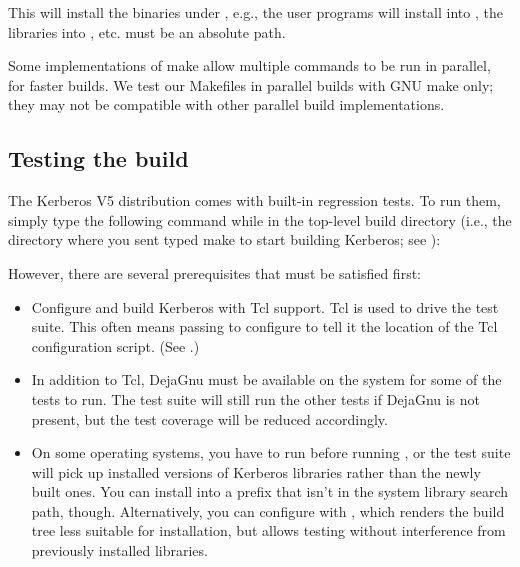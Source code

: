 \documentclass[letterpaper,10pt,english]{sphinxmanual}
\begin{document}
This will install the binaries under , e.g., the user
programs will install into , the libraries into
, etc.   must be an absolute path.

Some implementations of make allow multiple commands to be run in
parallel, for faster builds.  We test our Makefiles in parallel builds
with GNU make only; they may not be compatible with other parallel
build implementations.


\subsection{Testing the build}
\label{\detokenize{build/doing_build:testing-the-build}}
The Kerberos V5 distribution comes with built-in regression tests.  To
run them, simply type the following command while in the top-level
build directory (i.e., the directory where you sent typed make to
start building Kerberos; see {\hyperref[\detokenize{build/doing_build:do-build}]{}}):

%
\begin{sphinxVerbatim}[commandchars=\\\{\}]
 
\end{sphinxVerbatim}

However, there are several prerequisites that must be satisfied first:
\begin{itemize}
\item {} 
Configure and build Kerberos with Tcl support. Tcl is used to drive
the test suite.  This often means passing \sphinxstylestrong{-} to
configure to tell it the location of the Tcl configuration
script. (See {\hyperref[\detokenize{build/options2configure:options2configure}]{}}.)

\item {} 
In addition to Tcl, DejaGnu must be available on the system for some
of the tests to run.  The test suite will still run the other tests
if DejaGnu is not present, but the test coverage will be reduced
accordingly.

\item {} 
On some operating systems, you have to run  before
running , or the test suite will pick up installed
versions of Kerberos libraries rather than the newly built ones.
You can install into a prefix that isn’t in the system library
search path, though. Alternatively, you can configure with
\sphinxstylestrong{-}, which renders the build tree less suitable for
installation, but allows testing without interference from
previously installed libraries.

\end{itemize}
\end{document}
